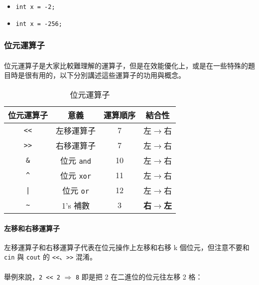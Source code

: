 \documentclass[12pt,a4paper,oneside]{article}
\begin{document}
\begin{CJK}{UTF8}{bkai}
\begin{itemize}
\item \lstinline!int x = -2;!
\item \lstinline!int x = -256;!
\end{itemize}
  
\subsubsection{位元運算子}

\paragraph{}位元運算子是大家比較難理解的運算子，但是在效能優化上，或是在一些特殊的題目時是很有用的，以下分別講述這些運算子的功用與概念。
\begin{table}[h!]
\centering
\begin{tabular}{|c|c|c|c|}
\hline
位元運算子 & 意義 & 運算順序 & 結合性\\
\hline
\hline
\lstinline!<<! & 左移運算子 & 7 & 左$\rightarrow$右\\
\hline
\lstinline!>>! & 右移運算子 & 7 & 左$\rightarrow$右\\
\hline
\lstinline!&!  & 位元 \texttt{and} & 10 & 左$\rightarrow$右\\
\hline
\lstinline!^!  & 位元 \texttt{xor} & 11 & 左$\rightarrow$右\\
\hline
\lstinline!|!  & 位元 \texttt{or} & 12 & 左$\rightarrow$右\\
\hline
\lstinline!~!  & 1's 補數  & 3 & \textbf{右$\rightarrow$左}\\
\hline
\end{tabular}
\caption{位元運算子}
\label{basic:cpp:table:operator:bitwise}
\end{table}

\paragraph{左移和右移運算子}左移運算子和右移運算子代表在位元操作上左移和右移 k 個位元，但注意不要和 \lstinline!cin! 與 \lstinline!cout! 的 \lstinline!<<!、\lstinline!>>! 混淆。

\paragraph{}舉例來說，\lstinline!2 << 2!{ $\Rightarrow$ \lstinline!8!} 即是把 2 在二進位的位元往左移 2 格：


\end{CJK}
\end{document}
